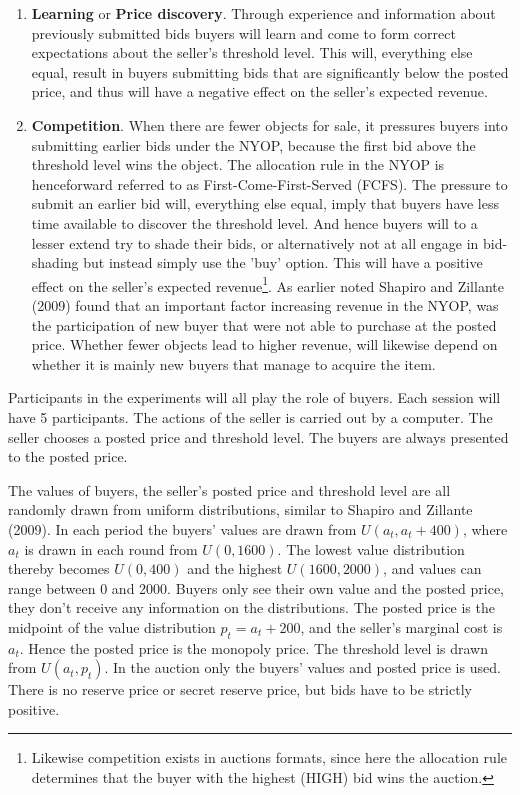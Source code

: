 \documentclass[a4paper,12pt]{article}
\begin{document}
	\begin{enumerate}
		\item {\bf Learning} or {\bf Price discovery}. Through experience and information about previously submitted bids buyers will learn and come to form correct expectations about the seller's threshold level. This will, everything else equal, result in buyers submitting bids that are significantly below the posted price, and thus will have a negative effect on the seller's expected revenue.
	 	\item {\bf Competition}. When there are fewer objects for sale, it pressures buyers into submitting earlier bids under the NYOP, because the first bid above the threshold level wins the object. The allocation rule in the NYOP is henceforward referred to as First-Come-First-Served (FCFS). The pressure to submit an earlier bid will, everything else equal, imply that buyers have less time available to discover the threshold level. And hence buyers will to a lesser extend try to shade their bids, or alternatively not at all engage in bid-shading but instead simply use the 'buy' option. This will have a positive effect on the seller's expected revenue\footnote{Likewise competition exists in auctions formats, since here the allocation rule determines that the buyer with the highest (HIGH) bid wins the auction.}. As earlier noted Shapiro and Zillante (2009) found that an important factor increasing revenue in the NYOP, was the participation of new buyer that were not able to purchase at the posted price. Whether fewer objects lead to higher revenue, will likewise depend on whether it is mainly new buyers that manage to acquire the item.
	\end{enumerate}

	Participants in the experiments will all play the role of buyers. Each session will have 5 participants. The actions of the seller is carried out by a computer. The seller chooses a posted price and threshold level. The buyers are always presented to the posted price.

	The values of buyers, the seller's posted price and threshold level are all randomly drawn from uniform distributions, similar to Shapiro and Zillante (2009). In each period the buyers' values are drawn from $U(a_t , a_t + 400)$, where $a_t$ is drawn in each round from $U(0, 1600)$. The lowest value distribution thereby becomes $U(0, 400)$ and the highest $U(1600, 2000)$, and values can range between 0 and 2000. Buyers only see their own value and the posted price, they don't receive any information on the distributions. The posted price is the midpoint of the value distribution $p_t = a_t + 200$, and the seller's marginal cost is $a_t$. Hence the posted price is the monopoly price. The threshold level is drawn from $U(a_t, p_t)$. In the auction only the buyers' values and posted price is used. There is no reserve price or secret reserve price, but bids have to be strictly positive.
\end{document}
